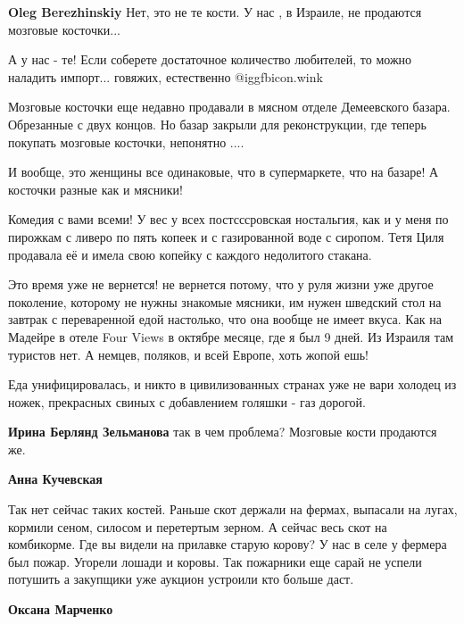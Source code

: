 \begin{itemize}
\begin{itemize}
\begin{itemize} %
\textbf{Oleg Berezhinskiy}
Нет, это не те кости.
У нас , в Израиле, не продаются мозговые косточки...

А у нас - те! Если соберете достаточное количество любителей, то можно наладить импорт... говяжих, естественно  @igg{fbicon.wink} 
\end{itemize} %


Мозговые косточки еще недавно продавали в мясном отделе Демеевского
базара. Обрезанные с двух концов. Но базар закрыли для реконструкции, где теперь
покупать мозговые косточки, непонятно ....

И вообще, это женщины все одинаковые, что в супермаркете, что на базаре! А
косточки разные как и мясники!


Комедия с вами всеми! У вес у всех постсссровская ностальгия, как и у меня по
пирожкам с ливеро по пять копеек и с газированной воде с сиропом. Тетя Циля
продавала её и имела свою копейку с каждого недолитого стакана.

Это время уже не вернется! не вернется потому, что у руля жизни уже другое
поколение, которому не нужны знакомые мясники, им нужен шведский стол на
завтрак с переваренной едой настолько, что она вообще не имеет вкуса. Как на
Мадейре в отеле Four Views в октябре месяце, где я был 9 дней. Из Израиля там
туристов нет. А немцев, поляков, и всей Европе, хоть жопой ешь!

Еда унифицировалась, и никто в цивилизованных странах уже не вари холодец из
ножек, прекрасных свиных с добавлением голяшки - газ дорогой.

\textbf{Ирина Берлянд Зельманова} так в чем проблема? Мозговые кости продаются же.

\begin{itemize} %
\textbf{Анна Кучевская} 

Так нет сейчас таких костей. Раньше скот держали на фермах, выпасали на
лугах, кормили сеном, силосом и перетертым зерном. А сейчас весь скот на
комбикорме. Где вы видели на прилавке старую корову? У нас в селе у фермера был
пожар. Угорели лошади и коровы. Так пожарники еще сарай не успели потушить а
закупщики уже аукцион устроили кто больше даст.

\textbf{Оксана Марченко} 


\end{itemize}
\end{itemize}
\end{itemize}
